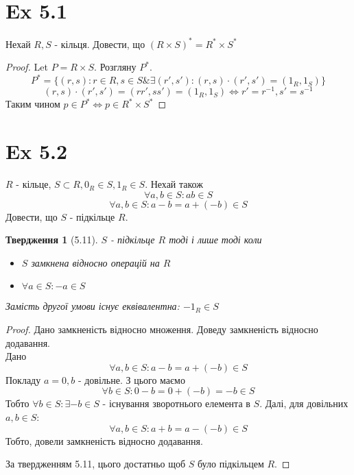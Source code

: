 \documentclass[11pt, a4paper]{article} %
\newtheorem*{proposition}{Твердження}
\begin{document}
\section*{Ex 5.1}
\begin{mdframed}
Нехай $R,S$ - кільця. Довести, що $(R\times S)^* = R^* \times S^*$
\end{mdframed}

\begin{proof}
    Let $P = R\times S$.
    Розгляну $P^*$.
    \[P^* = \{(r,s): r\in R, s\in S \& \exists (r',s'): (r,s)\cdot (r',s') = (1_R, 1_S)\}\]
    \[(r,s)\cdot (r',s') = (rr',ss') = (1_R, 1_S) \iff r'=r^{-1}, s'=s^{-1}\]
    Таким чином $p \in P^* \iff p \in R^*\times S^*$
\end{proof}

\section*{Ex 5.2}
\begin{mdframed}
    $R$ - кільце, $S \subset R, 0_R \in S, 1_R \in S$.
    Нехай також
    \[\forall a,b \in S: ab \in S\]
    \[\forall a,b \in S: a-b = a+(-b) \in S\]
    Довести, що $S$ -  підкільце $R$.
\end{mdframed}

\begin{mdframed}[backgroundcolor=blue!10]
    \begin{proposition}[5.11]
        $S$ - підкільце $R$ тоді і лише тоді коли
        \begin{itemize}
            \item $S$ замкнена відносно операцій на $R$
            \item $\forall a\in S: -a \in S$
        \end{itemize}
        Замість другої умови існує еквівалентна: $-1_R\in S$
    \end{proposition}
\end{mdframed}

\begin{proof}
    Дано замкненість відносно множення. Доведу замкненість відносно додавання.\\
    Дано
    \[\forall a,b \in S: a-b = a+(-b) \in S\]
    Покладу $a=0, b$ - довільне. З цього маємо
    \[\forall b\in S: 0-b = 0+(-b) = -b \in S\]
    Тобто $\forall b\in S: \exists -b \in S$ - існування зворотнього елемента в $S$.
    Далі, для довільних $a,b\in S$:
    \[\forall a,b\in S: a+b = a-(-b) \in S\]
    Тобто, довели замкненість відносно додавання.

    За твердженням 5.11, цього достатньо щоб $S$ було підкільцем $R$.
\end{proof}
\end{document}
